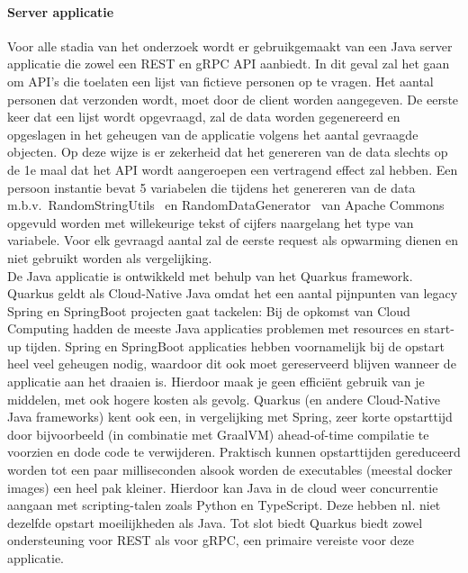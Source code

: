 \paragraph{Server applicatie}

Voor alle stadia van het onderzoek wordt er gebruikgemaakt van een Java server applicatie die zowel een REST en gRPC API aanbiedt.
In dit geval zal het gaan om API's die toelaten een lijst van fictieve personen op te vragen. Het aantal personen dat verzonden wordt, moet door de client worden aangegeven.
De eerste keer dat een lijst wordt opgevraagd, zal de data worden gegenereerd en opgeslagen in het geheugen van de applicatie volgens het aantal gevraagde objecten.
Op deze wijze is er zekerheid dat het genereren van de data slechts op de 1e maal dat het API wordt aangeroepen een vertragend effect zal hebben.
Een persoon instantie bevat 5 variabelen die tijdens het genereren van de data m.b.v.\ RandomStringUtils~\parencite{RandomStringUtils}
en RandomDataGenerator~\parencite{RandomDataGenerator} van Apache Commons opgevuld worden met willekeurige tekst of cijfers naargelang het type van variabele.
Voor elk gevraagd aantal zal de eerste request als opwarming dienen en niet gebruikt worden als vergelijking.\\

De Java applicatie is ontwikkeld met behulp van het Quarkus framework. Quarkus geldt als Cloud-Native Java omdat het een aantal pijnpunten van legacy
Spring en SpringBoot projecten gaat tackelen: Bij de opkomst van Cloud Computing hadden de meeste Java applicaties problemen met resources en start-up tijden.
Spring en SpringBoot applicaties hebben voornamelijk bij de opstart heel veel geheugen nodig, waardoor dit ook moet gereserveerd blijven wanneer de applicatie aan het draaien is.
Hierdoor maak je geen effici\"ent gebruik van je middelen, met ook hogere kosten als gevolg. Quarkus (en andere Cloud-Native Java frameworks) kent ook een, in vergelijking met Spring,
zeer korte opstarttijd door bijvoorbeeld (in combinatie met GraalVM) ahead-of-time compilatie te voorzien en dode code te verwijderen.
Praktisch kunnen opstarttijden gereduceerd worden tot een paar milliseconden alsook worden de executables (meestal docker images) een heel pak kleiner.
Hierdoor kan Java in de cloud weer concurrentie aangaan met scripting-talen zoals Python en TypeScript. Deze hebben nl. niet dezelfde opstart moeilijkheden als Java.
Tot slot biedt Quarkus biedt zowel ondersteuning voor REST als voor gRPC, een primaire vereiste voor deze applicatie.\newline
~\autocite{reasonQuarkus,whatisQuarkus,reasonQuarkus2,quarkusAbout}\\

